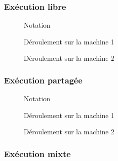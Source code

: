\documentclass[handout]{beamer}
\begin{document}
\begin{frame}
\frametitle{Exécution libre}
\begin{figure}
    \centering
    \begin{tikzpicture}
    
    \end{tikzpicture}
    \caption{Notation}
\end{figure}
\begin{figure}
    \centering
    \begin{tikzpicture}
    
    \end{tikzpicture}
    \caption{Déroulement sur la machine 1}
\end{figure}
\begin{figure}
    \centering
    \begin{tikzpicture}
    
    \end{tikzpicture}
    \caption{Déroulement sur la machine 2}
\end{figure}
\end{frame}
\begin{frame}
\frametitle{Exécution partagée}
\begin{figure}
    \centering
    \begin{tikzpicture}
    
    \end{tikzpicture}
    \caption{Notation}
\end{figure}
\begin{figure}
    \centering
    \begin{tikzpicture}
    
    \end{tikzpicture}
    \caption{Déroulement sur la machine 1}
\end{figure}
\begin{figure}
    \centering
    \begin{tikzpicture}
    
    \end{tikzpicture}
    \caption{Déroulement sur la machine 2}
\end{figure}
\end{frame}
\begin{frame}
\frametitle{Exécution mixte}
\end{frame}
\end{document}
